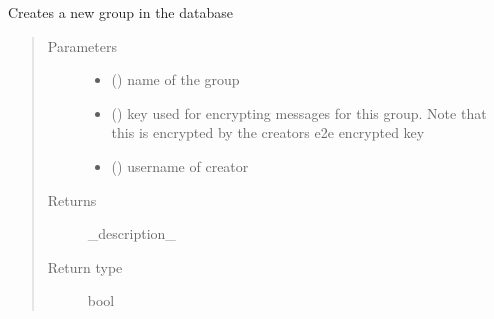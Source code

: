 \documentclass[letterpaper,10pt,english]{sphinxmanual}
\begin{document}

\begin{fulllineitems}
\label{\detokenize{db:db.createGroup}}
Creates a new group in the database
\begin{quote}\begin{description}
\item[{Parameters}] \leavevmode\begin{itemize}
\item {} 
 () \textendash{} name of the group

\item {} 
 () \textendash{} key used for encrypting messages for this group. Note that this is encrypted by the creators e2e encrypted key

\item {} 
 () \textendash{} username of creator

\end{itemize}

\item[{Returns}] \leavevmode
\_description\_

\item[{Return type}] \leavevmode
bool

\end{description}\end{quote}

\end{fulllineitems}

\end{document}
